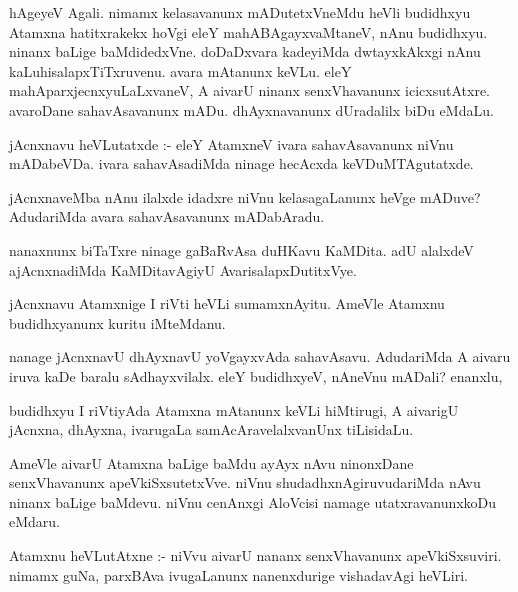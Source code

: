 \documentclass{article}
\begin{document}
\begin{mn}
hAgeyeV Agali. nimamx kelasavanunx mADutetxVneMdu heVli budidhxyu Atamxna 
hatitxrakekx hoVgi eleY mahABAgayxvaMtaneV, nAnu budidhxyu. ninanx baLige
 baMdidedxVne. doDaDxvara kadeyiMda dwtayxkAkxgi nAnu kaLuhisalapxTiTxruvenu.
 avara mAtanunx keVLu.  eleY mahAparxjecnxyuLaLxvaneV, A aivarU ninanx
 senxVhavanunx  icicxsutAtxre. avaroDane sahavAsavanunx mADu. dhAyxnavanunx
  dUradalilx biDu eMdaLu. 
\end{mn}

\begin{mn}
jAcnxnavu heVLutatxde :- eleY AtamxneV ivara sahavAsavanunx niVnu mADabeVDa.
ivara sahavAsadiMda ninage hecAcxda keVDuMTAgutatxde. 
\end{mn}

\begin{mn}
jAcnxnaveMba nAnu ilalxde idadxre niVnu kelasagaLanunx heVge mADuve?
 AdudariMda avara sahavAsavanunx mADabAradu.
\end{mn}

\begin{mn}
nanaxnunx biTaTxre ninage gaBaRvAsa duHKavu KaMDita.  adU alalxdeV ajAcnxnadiMda
KaMDitavAgiyU AvarisalapxDutitxVye. 
\end{mn}

\begin{mn}
jAcnxnavu Atamxnige I riVti heVLi sumamxnAyitu. AmeVle Atamxnu budidhxyanunx
kuritu iMteMdanu. 
\end{mn}

\begin{mn}
nanage jAcnxnavU dhAyxnavU yoVgayxvAda  sahavAsavu. AdudariMda A aivaru
 iruva kaDe baralu sAdhayxvilalx.  eleY budidhxyeV, nAneVnu mADali? enanxlu,
\end{mn}

\begin{mn}
budidhxyu I riVtiyAda Atamxna mAtanunx keVLi hiMtirugi, A aivarigU jAcnxna,
 dhAyxna, ivarugaLa samAcAravelalxvanUnx tiLisidaLu. 
\end{mn}

\begin{mn}
AmeVle  aivarU Atamxna baLige baMdu ayAyx nAvu ninonxDane senxVhavanunx 
apeVkiSxsutetxVve. niVnu shudadhxnAgiruvudariMda nAvu ninanx baLige baMdevu.
niVnu cenAnxgi AloVcisi namage utatxravanunxkoDu eMdaru.
\end{mn}

\begin{mn}
Atamxnu heVLutAtxne :- niVvu aivarU nananx senxVhavanunx apeVkiSxsuviri. 
nimamx guNa, parxBAva ivugaLanunx nanenxdurige vishadavAgi heVLiri.
\end{mn}
\end{document}
